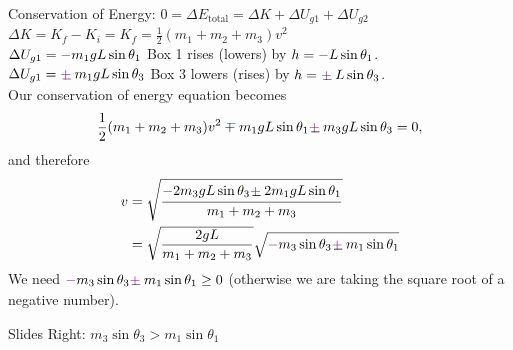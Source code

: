 \documentclass[]{article}
\begin{document}
\begin{TeacherMargin}
\noindent Conservation of Energy: $0 = \Delta E_{\text{total}} = \Delta K + \Delta U_{g1} + \Delta U_{g2}$ \\
$\Delta K = K_{f}-K_{i} = K_{f} = \frac{1}{2}(m_{1}+m_{2}+m_{3})v^{2}$ \\
$\Delta U_{g1} = {\color{violet}-}m_{1}gL\sin\theta_{1}$ \quad Box 1 rises {\color{violet}(lowers)} by $h={\color{violet}-}L\sin\theta_{1}$. \\
$\Delta U_{g1} = \Vpm m_{1}gL\sin\theta_{3}$ \quad Box 3 lowers {\color{violet}(rises)} by $h=\Vpm L\sin\theta_{3}$. \\
Our conservation of energy equation becomes
\[
\frac{1}{2}(m_{1}+m_{2}+m_{3})v^{2} \Vmp m_{1}gL\sin\theta_{1} \Vpm m_{3}gL\sin\theta_{3} = 0,
\]
and therefore
\begin{align*}
	v & = \sqrt{\frac{{\color{violet}-}2m_{3}gL\sin\theta_{3} \Vpm 2m_{1}gL\sin\theta_{1}}{m_{1}+m_{2}+m_{3}}} \\
	& =\sqrt{\frac{2gL}{m_{1}+m_{2}+m_{3}}}\sqrt{{\color{violet}-}m_{3}\sin\theta_{3}\Vpm m_{1}\sin\theta_{1}}
\end{align*}
We need ${\color{violet}-}m_{3}\sin\theta_{3}\Vpm m_{1}\sin\theta_{1}\geq0$ (otherwise we are taking the square root of a negative number).
\vspace{-10pt}
\begin{multicols}{2}
	\noindent Slides Right: $m_{3}\sin\theta_{3} > m_{1}\sin\theta_{1}$
	

\end{multicols}
\end{TeacherMargin}
\end{document}

